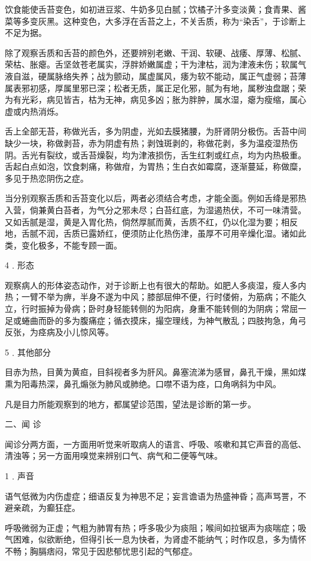 \documentclass[12pt,UTF8]{ctexbook}
\begin{document}
饮食能使舌苔变色，如初进豆浆、牛奶多见白腻；饮橘子汁多变淡黄；食青果、酱菜等多变灰黑。这种变色，大多浮在舌苔之上，不关舌质，称为“染舌”，于诊断上不足为据。

除了观察舌质和舌苔的颜色外，还要辨别老嫩、干润、软硬、战痿、厚薄、松腻、荣枯、胀瘪。舌坚敛苍老属实，浮胖娇嫩属虚；干为津枯，润为津液未伤；软属气液自滋，硬属脉络失养；战为颤动，属虚属风，痿为软不能动，属正气虚弱；苔薄属表邪初感，厚属里邪已深；松者无质，属正足化邪，腻为有地，属秽浊盘踞；荣为有光彩，病见皆吉，枯为无神，病见多凶；胀为胖肿，属水湿，瘪为瘦缩，属心虚或内热消烁。

舌上全部无苔，称做光舌，多为阴虚，光如去膜猪腰，为肝肾阴分极伤。舌苔中间缺少一块，称做剥苔，赤为阴虚有热；剥蚀斑剥的，称做花剥，多为温疫湿热伤阴。舌光有裂纹，或舌苔燥裂，均为津液损伤，舌生红刺或红点，均为内热极重。舌起白点如泡，饮食刺痛，称做疳，为胃热；生白衣如霉腐，逐渐蔓延，称做糜，多见于热恋阴伤之症。

当分别观察舌质和舌苔变化以后，两者必须结合考虑，才能全面。例如舌绛是邪热入营，倘兼黄白苔者，为气分之邪未尽；白苔红底，为湿遏热伏，不可一味清营。又如舌腻是湿，黄是入胃化热，倘然厚腻而黄，舌质不红，仍以化湿为要；相反地，舌腻不润，舌质已露娇红，便须防止化热伤津，虽厚不可用辛燥化湿。诸如此类，变化极多，不能专顾一面。

4﹒形态

观察病人的形体姿态动作，对于诊断上也有很大的帮助。如肥人多痰湿，瘦人多内热；一臂不举为痹，半身不遂为中风；膝部屈伸不便，行时偻俯，为筋病；不能久立，行时振掉为骨病；卧时身轻能转侧的为阳病，身重不能转侧的为阴病；常屈一足或蜷曲而卧的多为腹痛症；循衣摸床，撮空理线，为神气散乱；四肢拘急，角弓反张，为痉病及小儿惊风等。

5﹒其他部分

目赤为热，目黄为黄疸，目斜视者多为肝风。鼻塞流涕为感冒，鼻孔干燥，黑如煤熏为阳毒热深，鼻孔煽张为肺风或肺绝。口噤不语为痉，口角㖞斜为中风。

凡是目力所能观察到的地方，都属望诊范围，望法是诊断的第一步。

二、闻 诊

闻诊分两方面，一方面用听觉来听取病人的语言、呼吸、咳嗽和其它声音的高低、清浊等；另一方面用嗅觉来辨别口气、病气和二便等气味。

1﹒声音

语气低微为内伤虚症；细语反复为神思不足；妄言谵语为热盛神昏；高声骂詈，不避亲疏，为癫狂症。

呼吸微弱为正虚；气粗为肺胃有热；呼多吸少为痰阻；喉间如拉锯声为痰喘症；吸气困难，似欲断绝，但得引长一息为快者，为肾虚不能纳气；时作叹息，多为情怀不畅；胸膈痞闷，常见于因悲郁忧思引起的气郁症。
\end{document}
